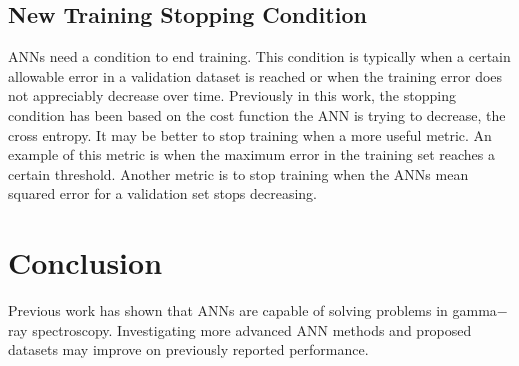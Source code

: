 \documentclass[tocnosub,noragright,centerchapter,12pt,fullpage]{uiucecethesis09}
\begin{document}
\section{New Training Stopping Condition}

ANNs need a condition to end training. This condition is typically when a certain allowable error in a validation dataset is reached or when the training error does not appreciably decrease over time. Previously in this work, the stopping condition has been based on the cost function the ANN is trying to decrease, the cross entropy. It may be better to stop training when a more useful metric. An example of this metric is when the maximum error in the training set reaches a certain threshold. Another metric is to stop training when the ANNs mean squared error for a validation set stops decreasing.



\chapter{Conclusion}

Previous work has shown that ANNs are capable of solving problems in gamma$-$ray spectroscopy. Investigating more advanced ANN methods and proposed datasets may improve on previously reported performance.








\end{document}
